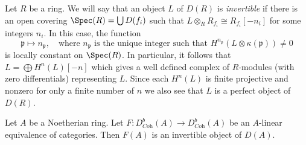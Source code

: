 \noindent
Let $R$ be a ring. We will say that an object $L$ of $D(R)$ is
{\it invertible} if there is an open covering $\Spec(R) = \bigcup D(f_i)$
such that $L \otimes_R R_{f_i} \cong R_{f_i}[-n_i]$ for some integers $n_i$.
In this case, the function
$$
\mathfrak p \mapsto n_\mathfrak p,\quad
\text{where }n_\mathfrak p\text{ is the unique integer such that }
H^{n_\mathfrak p}(L \otimes \kappa(\mathfrak p)) \not = 0
$$
is locally constant on $\Spec(R)$. In particular, it follows that
$L = \bigoplus H^n(L)[-n]$ which gives a well defined complex of
$R$-modules (with zero differentials) representing $L$. Since each
$H^n(L)$ is finite projective and nonzero for only a finite number of
$n$ we also see that $L$ is a perfect object of $D(R)$.

\begin{lemma}
\label{lemma-equivalence-comes-from-invertible}
Let $A$ be a Noetherian ring. Let
$F : D^b_{\textit{Coh}}(A) \to D^b_{\textit{Coh}}(A)$ be an $A$-linear
equivalence of categories. Then $F(A)$ is an invertible object of $D(A)$.
\end{lemma}

